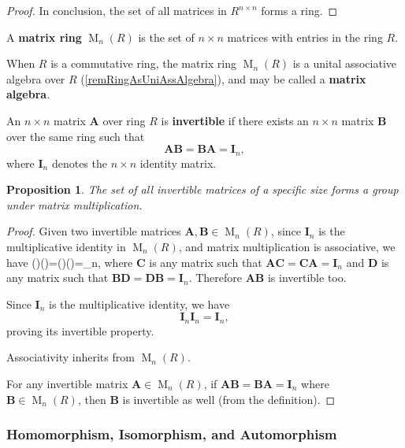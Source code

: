 \documentclass[12pt, letterpaper]{article}
\newcommand{\MM}{\operatorname{M}}
\newcommand{\idm}{\mathbf{I}}
\newcommand{\bfA}{\mathbf{A}}
\newcommand{\bfB}{\mathbf{B}}
\newcommand{\bfC}{\mathbf{C}}
\newcommand{\bfD}{\mathbf{D}}
\newenvironment{eqlong}{\equation\aligned}{\endaligned\endequation}
\newtheorem{prop}{Proposition}[section]
\theoremstyle{definition}
\theoremstyle{remark}
\theoremstyle{definition}
\theoremstyle{plain}
\numberwithin{equation}{section}
\begin{document}
\begin{proof}
		In conclusion, the set of all matrices in $R^{n\times n}$ forms a ring.
		
	\end{proof}
	
	\begin{def*}
		A \textbf{matrix ring} $\MM_n(R)$ is the set of $n\times n$ matrices with entries in the ring $R$.
	\end{def*}
	\begin{def*}
		When $R$ is a commutative ring, the matrix ring $\MM_n(R)$ is a unital associative algebra over $R$
		(\autoref{remRingAsUniAssAlgebra}),
		and may be called a \textbf{matrix algebra}. 
	\end{def*}
	
	\begin{def*}
		An $n \times n$ matrix $\mathbf{A}$ over ring $R$ is \textbf{invertible}
		if there exists an $n\times n$ matrix $\mathbf{B}$ over the same ring such that
		\[\mathbf{A}\mathbf{B}=\mathbf{B}\mathbf{A}=\idm_n,\]
		where $\idm_n$ denotes the $n\times n$ identity matrix.
	\end{def*}

	\begin{prop}
		The set of all invertible matrices of a specific size forms a group under matrix multiplication.
	\end{prop}

	\begin{proof}
		Given two invertible matrices $\bfA, \bfB \in \MM_n(R)$,
		since $\idm_n$ is the multiplicative identity in $\MM_n(R)$,
		and matrix multiplication is associative,
		we have
		\begin{eqlong}
			(\bfA\bfB)(\bfD\bfC)=(\bfD\bfC)(\bfA\bfB)=\idm_n,
		\end{eqlong}
		where $\bfC$ is any matrix such that $\bfA\bfC=\bfC\bfA=\idm_n$
		and $\bfD$ is any matrix such that $\bfB\bfD=\bfD\bfB=\idm_n$.
		Therefore $\bfA\bfB$ is invertible too.
		
		Since $\idm_{n}$ is the multiplicative identity,
		we have 
		\[\idm_n\idm_n=\idm_n,\]
		proving its invertible property.
		
		Associativity inherits from $\MM_n(R)$.
		
		For any invertible matrix $\bfA \in \MM_n(R)$, if $\bfA\bfB =\bfB\bfA=\idm_n$ where $\bfB\in\MM_n(R)$,
		then $\bfB$ is invertible as well (from the definition).
	\end{proof}

	\subsubsection{Homomorphism, Isomorphism, and Automorphism}
	
\end{document}
